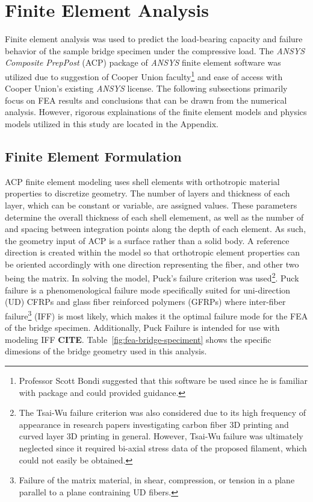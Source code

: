 \section{Finite Element Analysis}

\indent

Finite element analysis was used to predict the load-bearing capacity and failure behavior of the sample bridge specimen under the compressive load. The \textit{ANSYS Composite PrepPost} (ACP) package of \textit{ANSYS} finite element software was utilized due to suggestion of Cooper Union faculty\footnote{Professor Scott Bondi suggested that this software be used since he is familiar with package and could provided guidance.} and ease of access with Cooper Union's existing \textit{ANSYS} license. The following subsections primarily focus on FEA results and conclusions that can be drawn from the numerical analysis. However, rigorous explainations of the finite element models and physics models utilized in this study are located in the Appendix.\\

\subsection{Finite Element Formulation}

\indent

ACP finite element modeling uses shell elements with orthotropic material properties to discretize geometry. The number of layers and thickness of each layer, which can be constant or variable, are assigned values. These parameters determine the overall thickness of each shell elemement, as well as the number of and spacing between integration points along the depth of each element. As such, the geometry input of ACP is a surface rather than a solid body. A reference direction is created within the model so that orthotropic element properties can be oriented accordingly with one direction representing the fiber, and other two being the matrix. In solving the model, Puck's failure criterion was used\footnote{The Tsai-Wu failure criterion was also considered due to its high frequency of appearance in research papers investigating carbon fiber 3D printing and curved layer 3D printing in general. However, Tsai-Wu failure was ultimately neglected since it required bi-axial stress data of the proposed filament, which could not easily be obtained.}. Puck failure is a phenomenological failure mode specifically suited for uni-direction (UD) CFRPs and glass fiber reinforced polymers (GFRPs) where inter-fiber failure\footnote{Failure of the matrix material, in shear, compression, or tension in a plane parallel to a plane contraining UD fibers.} (IFF) is most likely, which makes it the optimal failure mode for the FEA of the bridge specimen. Additionally, Puck Failure is intended for use with modeling IFF \large{\textbf{CITE}}. Table~\ref{fig:fea-bridge-speciment} shows the specific dimesions of the bridge geometry used in this analysis.\\

